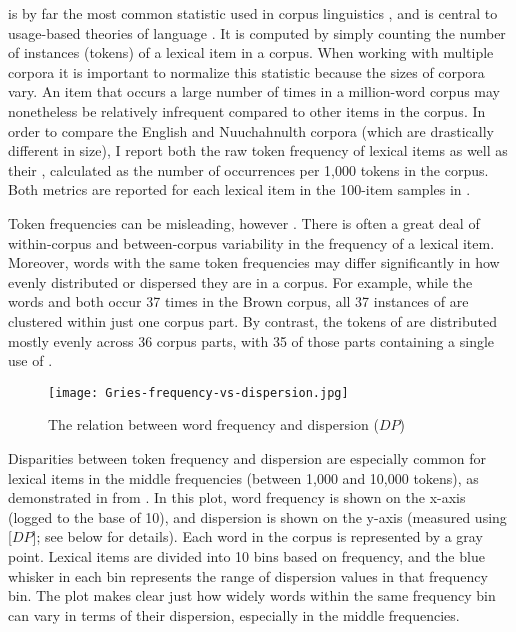  is by far the most common statistic used in corpus linguistics \parencite[403]{Gries2008}, and is central to usage-based theories of language \parencites{Bybee1985}{Tomasello2003}{Goldberg2006}{Bybee2007}{Bybee2010}{Diessel2019}. It is computed by simply counting the number of instances (tokens) of a lexical item in a corpus. When working with multiple corpora it is important to normalize this statistic because the sizes of corpora vary. An item that occurs a large number of times in a million-word corpus may nonetheless be relatively infrequent compared to other items in the corpus. In order to compare the English and Nuuchahnulth corpora (which are drastically different in size), I report both the raw token frequency of lexical items as well as their , calculated as the number of occurrences per 1,000 tokens in the corpus. Both metrics are reported for each lexical item in the 100-item samples in .

Token frequencies can be misleading, however \parencites{Gries2008}{Gries2021}{Griesfc}. There is often a great deal of within-corpus and between-corpus variability in the frequency of a lexical item. Moreover, words with the same token frequencies may differ significantly in how evenly distributed or dispersed they are in a corpus. For example, while the words  and  both occur 37 times in the Brown corpus, all 37 instances of  are clustered within just one corpus part. By contrast, the tokens of  are distributed mostly evenly across 36 corpus parts, with 35 of those parts containing a single use of  \parencite[100]{Gries2021}.

\begin{figure}
  \texttt{[image: Gries-frequency-vs-dispersion.jpg]}
  \caption[The relation between word frequency and dispersion (DP)]{The relation between word frequency and dispersion ($DP$) }
  \label{fig:Gries-frequency-vs-dispersion}
\end{figure}

Disparities between token frequency and dispersion are especially common for lexical items in the middle frequencies (between 1,000 and 10,000 tokens), as demonstrated in  from \textcite[112]{Gries2021}. In this plot, word frequency is shown on the x-axis (logged to the base of 10), and dispersion is shown on the y-axis (measured using  [$DP$]; see below for details). Each word in the corpus is represented by a gray point. Lexical items are divided into 10 bins based on frequency, and the blue whisker in each bin represents the range of dispersion values in that frequency bin. The plot makes clear just how widely words within the same frequency bin can vary in terms of their dispersion, especially in the middle frequencies.

